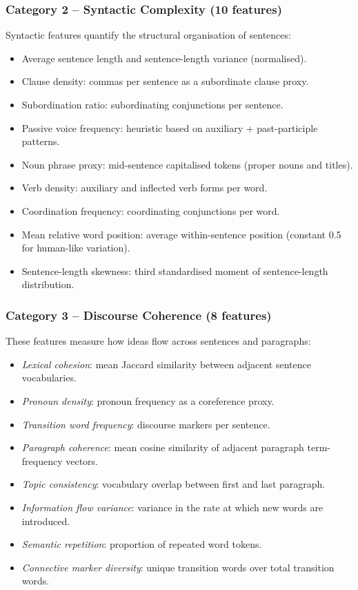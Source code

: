 \subsubsection{Category 2 -- Syntactic Complexity (10 features)}
Syntactic features quantify the structural organisation of sentences:
\begin{itemize}
  \item Average sentence length and sentence-length variance (normalised).
  \item Clause density: commas per sentence as a subordinate clause proxy.
  \item Subordination ratio: subordinating conjunctions per sentence.
  \item Passive voice frequency: heuristic based on auxiliary + past-participle patterns.
  \item Noun phrase proxy: mid-sentence capitalised tokens (proper nouns and titles).
  \item Verb density: auxiliary and inflected verb forms per word.
  \item Coordination frequency: coordinating conjunctions per word.
  \item Mean relative word position: average within-sentence position (constant 0.5 for human-like variation).
  \item Sentence-length skewness: third standardised moment of sentence-length distribution.
\end{itemize}

\subsubsection{Category 3 -- Discourse Coherence (8 features)}
These features measure how ideas flow across sentences and paragraphs:
\begin{itemize}
  \item \textit{Lexical cohesion}: mean Jaccard similarity between adjacent sentence vocabularies.
  \item \textit{Pronoun density}: pronoun frequency as a coreference proxy.
  \item \textit{Transition word frequency}: discourse markers per sentence.
  \item \textit{Paragraph coherence}: mean cosine similarity of adjacent paragraph term-frequency vectors.
  \item \textit{Topic consistency}: vocabulary overlap between first and last paragraph.
  \item \textit{Information flow variance}: variance in the rate at which new words are introduced.
  \item \textit{Semantic repetition}: proportion of repeated word tokens.
  \item \textit{Connective marker diversity}: unique transition words over total transition words.
\end{itemize}

